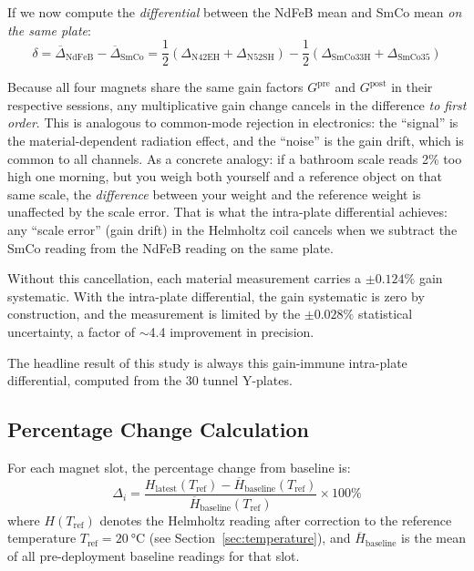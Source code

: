 \documentclass[11pt,letterpaper]{article}
\begin{document}
If we now compute the \emph{differential} between the NdFeB mean and SmCo mean
\emph{on the same plate}:
\begin{equation}
    \delta = \overline{\Delta}_\mathrm{NdFeB} - \overline{\Delta}_\mathrm{SmCo}
    = \frac{1}{2}(\Delta_\mathrm{N42EH} + \Delta_\mathrm{N52SH})
    - \frac{1}{2}(\Delta_\mathrm{SmCo33H} + \Delta_\mathrm{SmCo35})
\end{equation}

Because all four magnets share the same gain factors $G^\mathrm{pre}$ and
$G^\mathrm{post}$ in their respective sessions, any multiplicative gain change
cancels in the difference \emph{to first order}. This is analogous to
common-mode rejection in electronics: the ``signal'' is the material-dependent
radiation effect, and the ``noise'' is the gain drift, which is common to all
channels. As a concrete analogy: if a bathroom scale reads 2\% too high one
morning, but you weigh both yourself and a reference object on that same scale,
the \emph{difference} between your weight and the reference weight is
unaffected by the scale error. That is what the intra-plate differential
achieves: any ``scale error'' (gain drift) in the Helmholtz coil cancels when
we subtract the SmCo reading from the NdFeB reading on the same plate.

Without this cancellation, each material
measurement carries a $\pm 0.124\%$ gain systematic. With the intra-plate
differential, the gain systematic is zero by construction, and the
measurement is limited by the $\pm 0.028\%$ statistical uncertainty, a factor
of $\sim$4.4 improvement in precision.

The headline result of this study is always this gain-immune
intra-plate differential, computed from the 30 tunnel Y-plates.

\subsection{Percentage Change Calculation}

For each magnet slot, the percentage change from baseline is:
\begin{equation}
    \Delta_i = \frac{H_\mathrm{latest}(T_\mathrm{ref}) - \overline{H}_\mathrm{baseline}(T_\mathrm{ref})}{\overline{H}_\mathrm{baseline}(T_\mathrm{ref})} \times 100\%
    \label{eq:pct_change}
\end{equation}
where $H(T_\mathrm{ref})$ denotes the Helmholtz reading after correction to the
reference temperature $T_\mathrm{ref} = \SI{20}{\celsius}$ (see
Section~\ref{sec:temperature}), and $\overline{H}_\mathrm{baseline}$ is the
mean of all pre-deployment baseline readings for that slot.
\end{document}
